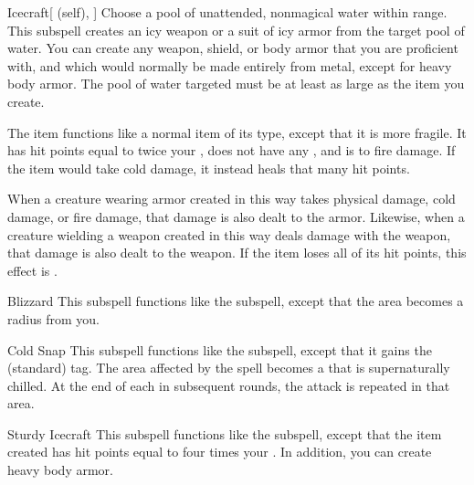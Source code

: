 \begin{ability}[\nth{1}]{Icecraft}[ (self), ]
Choose a pool of unattended, nonmagical water within \rngclose range.
This subspell creates an icy weapon or a suit of icy armor from the target pool of water.
You can create any weapon, shield, or body armor that you are proficient with, and which would normally be made entirely from metal, except for heavy body armor.
The pool of water targeted must be at least as large as the item you create.

The item functions like a normal item of its type, except that it is more fragile.
It has hit points equal to twice your , does not have any , and is  to fire damage.
If the item would take cold damage, it instead heals that many hit points.

When a creature wearing armor created in this way takes physical damage, cold damage, or fire damage, that damage is also dealt to the armor.
Likewise, when a creature wielding a weapon created in this way deals damage with the weapon, that damage is also dealt to the weapon.
If the item loses all of its hit points, this effect is .
\end{ability}
\vspace{0.25em}



\begin{ability}[\nth{2}]{Blizzard}
This subspell functions like the  subspell, except that the area becomes a \areamed radius from you.
\end{ability}
\vspace{0.25em}



\begin{ability}[\nth{2}]{Cold Snap}
This subspell functions like the  subspell, except that it gains the  (standard) tag.
The area affected by the spell becomes a  that is supernaturally chilled.
At the end of each  in subsequent rounds, the attack is repeated in that area.
\end{ability}
\vspace{0.25em}



\begin{ability}[\nth{2}]{Sturdy Icecraft}
This subspell functions like the  subspell, except that the item created has hit points equal to four times your .
In addition, you can create heavy body armor.
\end{ability}
\vspace{0.25em}



